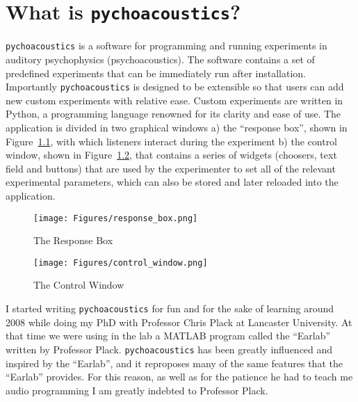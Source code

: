 \chapter{What is \texttt{pychoacoustics}?}

\texttt{pychoacoustics} is a software for programming and running experiments in auditory psychophysics (psychoacoustics). The software contains a set of predefined experiments that can be immediately run after installation. Importantly \texttt{pychoacoustics} is designed to be extensible so that users can add new custom experiments with relative ease. Custom experiments are written in Python, a programming language renowned for its clarity and ease of use. The application is divided in two graphical windows a) the ``response box'', shown in Figure~\ref{fig:response_box}, with which listeners interact during the experiment b) the control window, shown in Figure~\ref{fig:control_window}, that contains a series of widgets (choosers, text field and buttons) that are used by the experimenter to set all of the relevant experimental parameters, which can also be stored and later reloaded into the application. %

\begin{figure}[!h]
   \caption{The Response Box}
   \centering
   \texttt{[image: Figures/response\_box.png]}
   \label{fig:response_box}
 \end{figure}

\begin{figure}[!h]
   \caption{The Control Window}
   \centering
   \texttt{[image: Figures/control\_window.png]}
   \label{fig:control_window}
 \end{figure}

I started writing \texttt{pychoacoustics} for fun and for the sake of learning around 2008 while doing my PhD with Professor Chris Plack at Lancaster University. At that time we were using in the lab a MATLAB program called the ``Earlab'' written by Professor Plack. \texttt{pychoacoustics} has been greatly influenced and inspired by the ``Earlab'', and it reproposes many of the same features that the ``Earlab'' provides. For this reason, as well as for the patience he had to teach me audio programming I am greatly indebted to Professor Plack. %




